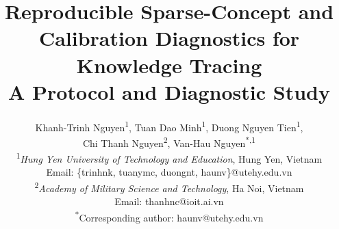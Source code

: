 \documentclass[12pt,a4paper]{jedm}
\begin{document}
\title{\sffamily\bfseries Reproducible Sparse-Concept and Calibration Diagnostics for Knowledge Tracing\\
{\large A Protocol and Diagnostic Study}}

\author{
\sffamily Khanh-Trinh Nguyen\textsuperscript{1}, Tuan Dao Minh\textsuperscript{1}, Duong Nguyen Tien\textsuperscript{1}, \\
\sffamily Chi Thanh Nguyen\textsuperscript{2}, Van-Hau Nguyen\textsuperscript{*,1}\\[8pt]
\normalsize \textsuperscript{1}\textit{Hung Yen University of Technology and Education}, Hung Yen, Vietnam\\
\normalsize Email: \{trinhnk, tuanymc, duongnt, haunv\}@utehy.edu.vn\\[4pt]
\normalsize \textsuperscript{2}\textit{Academy of Military Science and Technology}, Ha Noi, Vietnam\\
\normalsize Email: thanhnc@ioit.ai.vn\\[8pt]
\normalsize \textsuperscript{*}Corresponding author: haunv@utehy.edu.vn
}
\date{}

\maketitle
\end{document}
